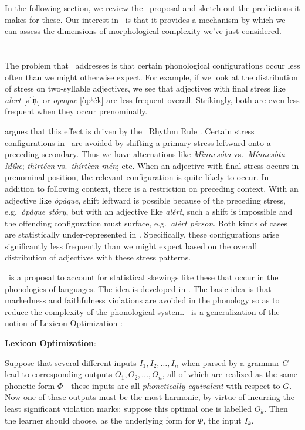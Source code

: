 \documentclass[output=paper,
modfonts
]{LSP/langsci}
\begin{document}
\noindent In the following section, we review the \io\ proposal and sketch out the predictions it makes for these. Our interest in \io\ is that it provides a mechanism by which we can assess the dimensions of morphological complexity we've just considered.

\section{\io}
\label{sec:io}

The problem that \io\ addresses is that certain phonological configurations occur less often than we might otherwise expect. For example, if we look at the distribution of stress on two-syllable adjectives, we see that adjectives with final stress like \emph{alert} [əlɹ̩́t] or \emph{opaque} [òpʰék] are less frequent overall. Strikingly, both are even less frequent when they occur prenominally.

\citet{inopt} argues that this effect is driven by the \e\ Rhythm Rule \citep{lp,hayesrhythm}. Certain stress configurations in \e\ are avoided by shifting a primary stress leftward onto a preceding secondary. Thus we have alternations like \emph{Mìnnesóta} vs.\ \emph{Mínnesòta Míke}; \emph{thìrtéen} vs.\ \emph{thírtèen mén}; etc. When an adjective with final stress occurs in prenominal position, the relevant configuration is quite likely to occur. In addition to following context, there is a restriction on preceding context. With an adjective like \emph{òpáque},  shift leftward is possible because of the preceding stress, e.g.\ \emph{ópàque stóry}, but with an adjective like \emph{alért}, such a shift is impossible and the offending configuration must surface, e.g.\ \emph{alért pérson}. Both kinds of cases are statistically under-represented in \e. Specifically, these configurations arise significantly less frequently than we might expect based on the overall distribution of adjectives with these stress patterns.

\io\ is a proposal to account for statistical skewings like these that occur in the phonologies of languages. The idea is developed in \citet{inopt,hammond.complexity,inopt.phon}. The basic idea is that markedness and faithfulness violations are avoided in the phonology so as to reduce the complexity of the phonological system. \io\ is a generalization of the notion of Lexicon Optimization \cite{ps}:

\ea
\textbf{Lexicon Optimization}:

Suppose that several different inputs $I_1, I_2, \ldots, I_n$ when parsed by a grammar $G$ lead to corresponding outputs $O_1, O_2, \ldots, O_n$, all of which are realized as the same phonetic form $\Phi$---these inputs are all \emph{phonetically equivalent} with respect to $G$. Now one of these outputs must be the most harmonic, by virtue of incurring the least significant violation marks: suppose this optimal one is labelled $O_k$. Then the learner should choose, as the underlying form for $\Phi$, the input $I_k$.
\z
\end{document}
